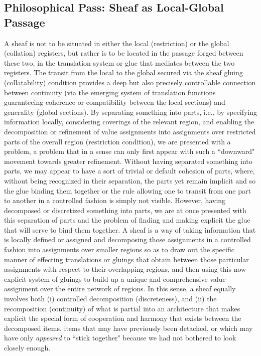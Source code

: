 \documentclass[a4paper]{book}
\theoremstyle{definition}
\theoremstyle{definition}
\theoremstyle{definition}
\theoremstyle{theorem}
\theoremstyle{definition}
\begin{document}
\subsection{Philosophical Pass: Sheaf as Local-Global Passage}
A sheaf is not to be situated in either the local (restriction) or the global (collation) registers, but rather is to be located in the passage forged between these two, in the translation system or glue that mediates between the two registers. The transit from the local to the global secured via the sheaf gluing (collatability) condition provides a deep but also precisely controllable connection between continuity (via the emerging system of translation functions guaranteeing coherence or compatibility between the local sections) and generality (global sections). By separating something into parts, i.e., by specifying information locally, considering coverings of the relevant region, and enabling the decomposition or refinement of value assignments into assignments over restricted parts of the overall region (restriction condition), we are presented with a problem, a problem that in a sense can only first appear with such a ``downward" movement towards greater refinement. Without having separated something into parts, we may appear to have a sort of trivial or default cohesion of parts, where, without being recognized in their separation, the parts yet remain implicit and so the glue binding them together or the rule allowing one to transit from one part to another in a controlled fashion is simply not visible. However, having decomposed or discretized something into parts, we are at once presented with this separation of parts and the problem of finding and making explicit the glue that will serve to bind them together. A sheaf is a way of taking information that is locally defined or assigned and decomposing those assignments in a controlled fashion into assignments over smaller regions so as to draw out the specific manner of effecting translations or gluings that obtain between those particular assignments with respect to their overlapping regions, and then using this now explicit system of gluings to build up a unique and comprehensive value assignment over the entire network of regions. In this sense, a sheaf equally involves both (i) controlled decomposition (discreteness), and (ii) the recomposition (continuity) of what is partial into an architecture that makes explicit the special form of cooperation and harmony that exists between the decomposed items, items that may have previously been detached, or which may have only \textit{appeared} to ``stick together" because we had not bothered to look closely enough.\par 
\end{document}
